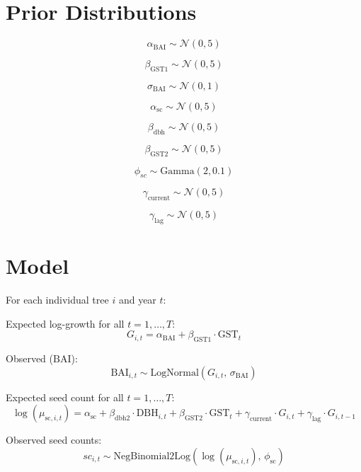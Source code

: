 \documentclass[11pt]{article}
\begin{document}
\section*{Prior Distributions}
\[
\alpha_{\text{BAI}} \sim \mathcal{N}(0,5)
\]

\[
\beta_{\text{GST1}} \sim \mathcal{N}(0,5)
\]

\[
\sigma_{\text{BAI}} \sim \mathcal{N}(0,1)
\]

\[
\alpha_{\text{sc}} \sim \mathcal{N}(0,5)
\]

\[
\beta_{\text{dbh}} \sim \mathcal{N}(0,5)
\]

\[
\beta_{\text{GST2}} \sim \mathcal{N}(0,5)
\]

\[
\phi_{sc} \sim \text{Gamma}(2,0.1)
\]

\[
\gamma_{\text{current}} \sim \mathcal{N}(0,5)
\]

\[
\gamma_{\text{lag}} \sim \mathcal{N}(0,5)
\]

\section*{Model}

For each individual tree $i$ and year $t$:

Expected log-growth for all $t = 1, \dots, T$:
\[
G_{i,t} = \alpha_{\text{BAI}} +  \beta_{\text{GST1}} \cdot \text{GST}_{t}
\]

Observed ($\text{BAI}$):
\[
\text{BAI}_{i,t} \sim \text{LogNormal}\left(G_{i,t}, \, \sigma_{\text{BAI}}\right)
\]

Expected seed count for all $t = 1, \dots, T$:
\[
\log(\mu_{\text{sc},i,t}) = \alpha_{\text{sc}} + \beta_{\text{dbh2}} \cdot \text{DBH}_{i,t} + \beta_{\text{GST2}} \cdot \text{GST}_{t} + \gamma_{\text{current}} \cdot G_{i,t} + \gamma_{\text{lag}} \cdot G_{i,t-1}
\]

Observed seed counts:
\[
sc_{i,t} \sim \text{NegBinomial2Log}\left(\log(\mu_{\text{sc},i,t}), \, \phi_{\text{sc}}\right)
\]
\end{document}
